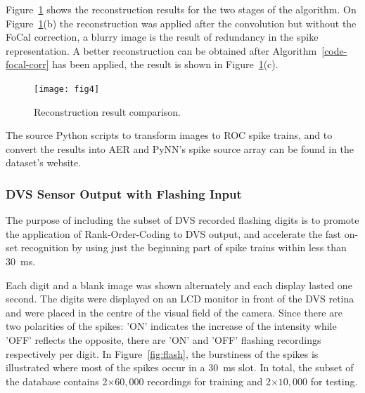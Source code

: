 \documentclass{frontiersENG} %
\begin{document}
Figure~\ref{fig-reconstruction-results} shows the reconstruction results for the two stages of the algorithm. On Figure~\ref{fig-reconstruction-results}(b) the reconstruction was applied after the convolution but without the FoCal correction, a blurry image is the result of redundancy in the spike representation. A better reconstruction can be obtained after Algorithm~\ref{code-focal-corr} has been applied, the result is shown in Figure~\ref{fig-reconstruction-results}(c).


\begin{figure}[hbt]
	\centering
	\texttt{[image: fig4]}
	\caption{Reconstruction result comparison.}
	\label{fig-reconstruction-results}
\end{figure}

The source Python scripts to transform images to ROC spike trains, and to convert the results into AER and PyNN's spike source array can be found in the dataset's website.
\subsubsection{DVS Sensor Output with Flashing Input}
\label{subsec_flash}
The purpose of including the subset of DVS recorded flashing digits is to promote the application of Rank-Order-Coding to DVS output, and accelerate the fast on-set recognition by using just the beginning part of spike trains within less than 30~ms.

Each digit and a blank image was shown alternately and each display lasted one second.
The digits were displayed on an LCD monitor in front of the DVS retina~\citep{serrano2013128} and were placed in the centre of the visual field of the camera.
Since there are two polarities of the spikes: 'ON' indicates the increase of the intensity while 'OFF' reflects the opposite, there are 'ON' and 'OFF' flashing recordings respectively per digit.
In Figure~\ref{fig:flash}, the burstiness of the spikes is illustrated where most of the spikes occur in a 30~ms slot. 
In total, the subset of the database contains 2$\times$$60,000$ recordings for training and 2$\times$$10,000$ for testing.
\end{document}
